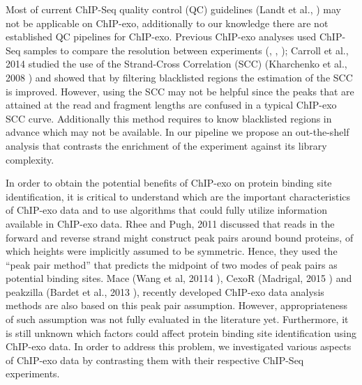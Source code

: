 \documentclass{bmcart}\usepackage[]{graphicx}\usepackage[]{color}
\begin{document}
Most of current ChIP-Seq quality control (QC) guidelines (Landt et
al., \cite{encode_qc}) may not be applicable on ChIP-exo, additionally
to our knowledge there are not established QC pipelines for
ChIP-exo. Previous ChIP-exo analyses used ChIP-Seq samples to compare
the resolution between experiments (\cite{exo1}, \cite{exo2},
\cite{exoillumina}); Carroll et al., 2014 \cite{carroll.qc} studied
the use of the Strand-Cross Correlation (SCC) (Kharchenko et al., 2008
\cite{strandcc}) and showed that by filtering blacklisted regions the
estimation of the SCC is improved. However, using the SCC may not be
helpful since the peaks that are attained at the read and fragment
lengths are confused in a typical ChIP-exo SCC curve. Additionally
this method requires to know blacklisted regions in advance which may
not be available. In our pipeline we propose an out-the-shelf analysis
that contrasts the enrichment of the experiment against its library
complexity.

In order to obtain the potential benefits of ChIP-exo on protein
binding site identification, it is critical to understand which are
the important characteristics of ChIP-exo data and to use algorithms
that could fully utilize information available in ChIP-exo data. Rhee
and Pugh, 2011 \cite{exo1} discussed that reads in the forward and
reverse strand might construct peak pairs around bound proteins, of
which heights were implicitly assumed to be symmetric. Hence, they
used the ``peak pair method'' that predicts the midpoint of two modes
of peak pairs as potential binding sites. Mace (Wang et al, 20114
\cite{mace}), CexoR (Madrigal, 2015 \cite{cexor}) and peakzilla
(Bardet et al., 2013 \cite{peakzilla}), recently developed ChIP-exo
data analysis methods are also based on this peak pair
assumption. However, appropriateness of such assumption was not fully
evaluated in the literature yet. Furthermore, it is still unknown
which factors could affect protein binding site identification using
ChIP-exo data. In order to address this problem, we investigated
various aspects of ChIP-exo data by contrasting them with their
respective ChIP-Seq experiments.
\end{document}
